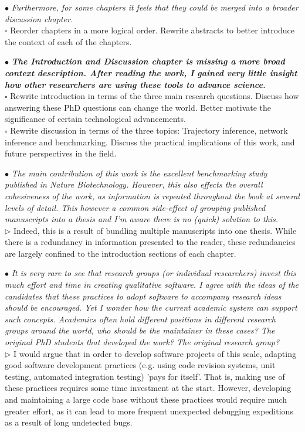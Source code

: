 \documentclass[10pt]{article}
\newcommand{\todo}{$\square$}
\newcommand{\exam}[2][\  ]{\hspace{0pt}\marginpar{\color{myred}#1}$\bullet$ \textit{#2}}
\newcommand{\imp}[1]{\textbf{#1}}
\newcommand{\nimp}[1]{{\color{mygray} #1}}
\newcommand{\answ}[1]{{\color{myblue} $\triangleright$ #1}}
\newcommand{\task}[2][\todo]{{\color{myblue} #1 #2}}
\newcommand{\bigexclaim}{\raisebox{-0.1em}{\BigTriangleUp}\hspace{-0.32em}\llap{\small\textbf{!}}\hspace{0.32em}}
\newcommand{\tagimp}{\bigexclaim}
\newcommand{\tagtime}{{\Large $\hourglass$}}
\begin{document}
\exam{Furthermore, for some chapters it feels that they could be merged into a broader discussion chapter.} \\
\task{Reorder chapters in a more logical order. Rewrite abstracts to better introduce the context of each of the chapters.}

\exam[\tagimp \tagtime]{\imp{The Introduction and Discussion chapter is missing a more broad context
	description. After reading the work, I gained very little insight how other
	researchers are using these tools to advance science.}} \\
\task{Rewrite introduction in terms of the three main research questions. Discuss how answering these PhD questions can change the world. Better motivate the significance of certain technological advancements.} \\
\task{Rewrite discussion in terms of the three topics: Trajectory inference, network inference and benchmarking. Discuss the practical implications of this work, and future perspectives in the field. }


\exam{\nimp{The main contribution of this work is the excellent benchmarking study
	published in Nature Biotechnology.} However, this also effects the overall
	cohesiveness of the work, as information is repeated throughout the book at
	several levels of detail. \nimp{This however a common side-effect of grouping
	published manuscripts into a thesis and I’m aware there is no (quick) solution
	to this.}} \\
\answ{Indeed, this is a result of bundling multiple manuscripts into one thesis. While there is a redundancy in information presented to the reader, these redundancies are largely confined to the introduction sections of each chapter.}

\exam{\nimp{It is very rare to see that research groups (or individual researchers) invest this
	much effort and time in creating qualitative software. I agree with the ideas of
	the candidates that these practices to adopt software to accompany research
	ideas should be encouraged.} Yet I wonder how the current academic system
	can support such concepts. Academics often hold different positions in
	different research groups around the world, who should be the maintainer in
	these cases? The original PhD students that developed the work? The original
	research group?} \\
\answ{I would argue that in order to develop software projects of this scale, adapting good software development practices (e.g. using code revision systems, unit testing, automated integration testing) 'pays for itself'. That is, making use of these practices requires some time investment at the start. However, developing and maintaining a large code base without these practices would require much greater effort, as it can lead to more frequent unexpected debugging expeditions as a result of long undetected bugs.}
\end{document}
